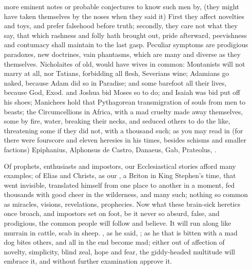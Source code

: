 {more eminent notes or probable conjectures to know such men by, (they
might have taken themselves by the noses when they said it) First
they affect novelties and toys, and prefer falsehood before truth;
secondly, they care not what they say, that which rashness and
folly hath brought out, pride afterward, peevishness and contumacy
shall maintain to the last gasp. Peculiar symptoms are prodigious
paradoxes, new doctrines, vain phantasms, which are many and diverse as
they themselves. Nicholaites of old, would have wives in common:
Montanists will not marry at all, nor Tatians, forbidding all flesh,
Severians wine; Adamians go naked, because Adam did so in
Paradise; and some barefoot all their lives, because God, Exod.
 and Joshua  bid Moses so to do; and Isaiah  was bid put off
his shoes; Manichees hold that Pythagorean transmigration of souls from
men to beasts; the Circumcellions in Africa, with a mad cruelty
made away themselves, some by fire, water, breaking their necks, and
seduced others to do the like, threatening some if they did not, with a
thousand such; as you may read in \Austin{} (for there were
fourscore and eleven heresies in his times, besides schisms and smaller
factions) Epiphanius, \textlatin{Alphonsus de Castro}, Danaeus, Gab, Prateolus, \etc{}.

Of prophets, enthusiasts and impostors, our Ecclesiastical stories
afford many examples; of Elias and Christs, as our , a Briton in King Stephen's time, that went invisible,
translated himself from one place to another in a moment, fed thousands with
good cheer in the wilderness, and many such; nothing so common as
miracles, visions, revelations, prophecies. Now what these brain-sick
heretics once broach, and impostors set on foot, be it never so absurd,
false, and prodigious, the common people will follow and believe. It
will run along like murrain in cattle, scab in sheep. , as
he said, ; as he that is bitten with a
mad dog bites others, and all in the end become mad; either out of
affection of novelty, simplicity, blind zeal, hope and fear, the
giddy-headed multitude will embrace it, and without further examination
approve it.

}
